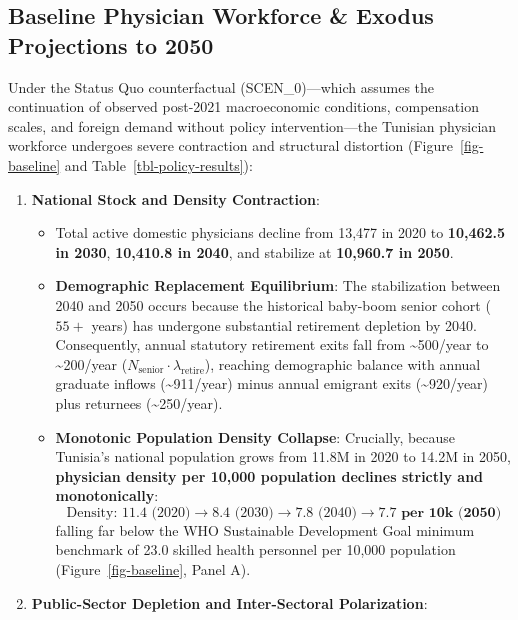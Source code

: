 \documentclass[
  11pt,
  a4paper]{article}
\providecommand{\tightlist}{%
  \setlength{\itemsep}{0pt}\setlength{\parskip}{0pt}}
\begin{document}
\subsection{Baseline Physician Workforce \& Exodus Projections to
2050}\label{sec-results-baseline}

Under the Status Quo counterfactual (SCEN\_0)---which assumes the
continuation of observed post-2021 macroeconomic conditions,
compensation scales, and foreign demand without policy
intervention---the Tunisian physician workforce undergoes severe
contraction and structural distortion (Figure~\ref{fig-baseline} and
Table~\ref{tbl-policy-results}):

\begin{enumerate}
\def\labelenumi{\arabic{enumi}.}
\tightlist
\item
  \textbf{National Stock and Density Contraction}:

  \begin{itemize}
  \tightlist
  \item
    Total active domestic physicians decline from 13,477 in 2020 to
    \textbf{10,462.5 in 2030}, \textbf{10,410.8 in 2040}, and stabilize
    at \textbf{10,960.7 in 2050}.
  \item
    \textbf{Demographic Replacement Equilibrium}: The stabilization
    between 2040 and 2050 occurs because the historical baby-boom senior
    cohort (\(55+\) years) has undergone substantial retirement
    depletion by 2040. Consequently, annual statutory retirement exits
    fall from \textasciitilde500/year to \textasciitilde200/year
    (\(N_{\text{senior}} \cdot \lambda_{\text{retire}}\)), reaching
    demographic balance with annual graduate inflows
    (\textasciitilde911/year) minus annual emigrant exits
    (\textasciitilde920/year) plus returnees (\textasciitilde250/year).
  \item
    \textbf{Monotonic Population Density Collapse}: Crucially, because
    Tunisia's national population grows from 11.8M in 2020 to 14.2M in
    2050, \textbf{physician density per 10,000 population declines
    strictly and monotonically}:
    \[\text{Density: } 11.4 \text{ (2020)} \longrightarrow 8.4 \text{ (2030)} \longrightarrow 7.8 \text{ (2040)} \longrightarrow \mathbf{7.7 \text{ per 10k (2050)}}\]
    falling far below the WHO Sustainable Development Goal minimum
    benchmark of 23.0 skilled health personnel per 10,000 population
    (Figure~\ref{fig-baseline}, Panel A).
  \end{itemize}
\item
  \textbf{Public-Sector Depletion and Inter-Sectoral Polarization}:


\end{enumerate}
\end{document}
